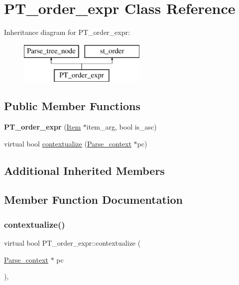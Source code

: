 \hypertarget{classPT__order__expr}{}\section{P\+T\+\_\+order\+\_\+expr Class Reference}
\label{classPT__order__expr}
Inheritance diagram for P\+T\+\_\+order\+\_\+expr\+:\begin{figure}[H]
\begin{center}
\leavevmode
\includegraphics[height=2.000000cm]{classPT__order__expr}
\end{center}
\end{figure}
\subsection*{Public Member Functions}
\begin{DoxyCompactItemize}
\item 
\mbox{\label{classPT__order__expr_ac74061e61ab3b96fc0286fc1da5b7558}} 
{\bfseries P\+T\+\_\+order\+\_\+expr} (\mbox{\hyperlink{classItem}{Item}} $\ast$item\+\_\+arg, bool is\+\_\+asc)
\item 
virtual bool \mbox{\hyperlink{classPT__order__expr_ae99fae42c1559e81262345d5eab0e32e}{contextualize}} (\mbox{\hyperlink{structParse__context}{Parse\+\_\+context}} $\ast$pc)
\end{DoxyCompactItemize}
\subsection*{Additional Inherited Members}


\subsection{Member Function Documentation}
\mbox{\label{classPT__order__expr_ae99fae42c1559e81262345d5eab0e32e}} 
\subsubsection{\texorpdfstring{contextualize()}{contextualize()}}
{\footnotesize\ttfamily virtual bool P\+T\+\_\+order\+\_\+expr\+::contextualize (\begin{DoxyParamCaption}\item[{\mbox{\hyperlink{structParse__context}{Parse\+\_\+context}} $\ast$}]{pc }\end{DoxyParamCaption})\hspace{0.3cm}{\ttfamily [inline]}, {\ttfamily [virtual]}}

